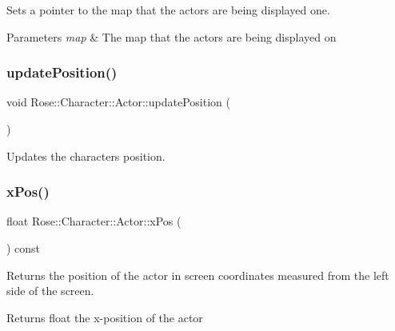 Sets a pointer to the map that the actors are being displayed one. 


\begin{DoxyParams}{Parameters}
{\em map} & The map that the actors are being displayed on \\
\hline
\end{DoxyParams}
\mbox{\label{classRose_1_1Character_1_1Actor_ab0bb6eb9619dab556e682572c3ec9f95}} 
\subsubsection{\texorpdfstring{updatePosition()}{updatePosition()}}
{\footnotesize\ttfamily void Rose\+::\+Character\+::\+Actor\+::update\+Position (\begin{DoxyParamCaption}{ }\end{DoxyParamCaption})\hspace{0.3cm}{\ttfamily [protected]}}



Updates the characters position. 

\mbox{\label{classRose_1_1Character_1_1Actor_a0668a9c0c457d1c45e709b48111ba79d}} 
\subsubsection{\texorpdfstring{xPos()}{xPos()}}
{\footnotesize\ttfamily float Rose\+::\+Character\+::\+Actor\+::x\+Pos (\begin{DoxyParamCaption}{ }\end{DoxyParamCaption}) const\hspace{0.3cm}{\ttfamily [virtual]}}



Returns the position of the actor in screen coordinates measured from the left side of the screen. 

\begin{DoxyReturn}{Returns}
float the x-\/position of the actor 
\end{DoxyReturn}
\mbox{\label{classRose_1_1Character_1_1Actor_a967b03cbbd0be4e1761cf3e99f4bb207}} 
